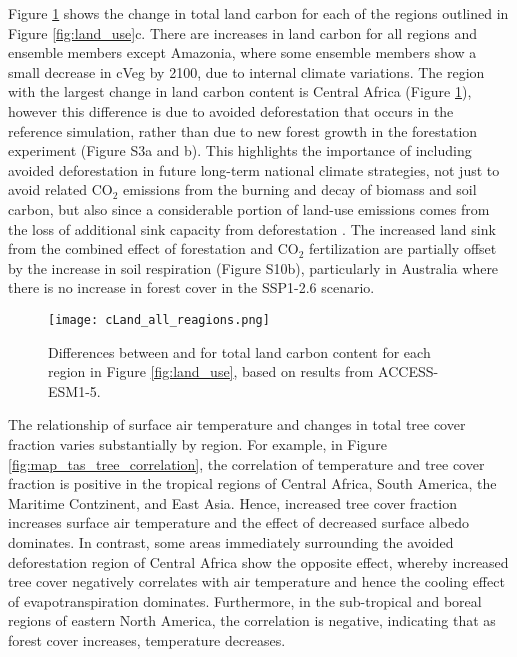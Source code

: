 \documentclass[draft]{agujournal2019}
\begin{document}
Figure \ref{fig:accesss_regional_cland} shows the change in total land carbon for each of the regions outlined in Figure \ref{fig:land_use}c.
There are increases in land carbon for all regions and ensemble members except Amazonia, where some ensemble members show a small decrease in cVeg by 2100, due to internal climate variations.
The region with the largest change in land carbon content is Central Africa (Figure \ref{fig:accesss_regional_cland}), however this difference is due to avoided deforestation that occurs in the reference simulation, rather than due to new forest growth in the forestation experiment (Figure S3a and b).
This highlights the importance of including avoided deforestation in future long-term national climate strategies, not just to avoid related CO$_2$ emissions from the burning and decay of biomass and soil carbon, but also since a considerable portion of land-use emissions comes from the loss of additional sink capacity from deforestation \cite{gitz_amplifying_2003, pongratz_terminology_2014, obermeier_modelled_2021}.
The increased land sink from the combined effect of forestation and CO$_2$ fertilization are partially offset by the increase in soil respiration (Figure S10b), particularly in Australia where there is no increase in forest cover in the SSP1-2.6 scenario.

\begin{figure}
    \texttt{[image: cLand\_all\_reagions.png]}
    \caption{Differences between  and  for total land carbon content for each region in Figure \ref{fig:land_use}, based on results from ACCESS-ESM1-5.}
    \label{fig:accesss_regional_cland}
\end{figure}

The relationship of surface air temperature and changes in total tree cover fraction varies substantially by region.
For example, in Figure \ref{fig:map_tas_tree_correlation}, the correlation of temperature and tree cover fraction is positive in the tropical regions of Central Africa, South America, the Maritime Contzinent, and East Asia.
Hence, increased tree cover fraction increases surface air temperature and the effect of decreased surface albedo dominates.
In contrast, some areas immediately surrounding the avoided deforestation region of Central Africa show the opposite effect, whereby increased tree cover negatively correlates with air temperature and hence the cooling effect of evapotranspiration dominates.
Furthermore, in the sub-tropical and boreal regions of eastern North America, the correlation is negative, indicating that as forest cover increases, temperature decreases.
\end{document}
